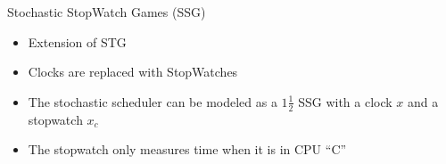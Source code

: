 \documentclass{beamer}
\begin{document}
      \begin{frame}{Stochastic StopWatch Games (SSG)}
        \begin{itemize}
        \item Extension of  STG
          \item Clocks are replaced with StopWatches
          \end{itemize}
                \begin{figure}[ht!]
   \begin{center}
     \begin{figure}
       \begin{center}



     \label{fig:ex1}
   \end{center}
 \end{figure}



     \label{fig:ex1}
   \end{center}
 \end{figure}
 \begin{itemize}
   \item The stochastic scheduler  can be modeled as a
     $1\frac{1}{2}$ SSG with a clock $x$ and a stopwatch $x_c$
   \item The stopwatch only measures time when it is in CPU ``C''

   \end{itemize}
         \end{frame}
\end{document}
